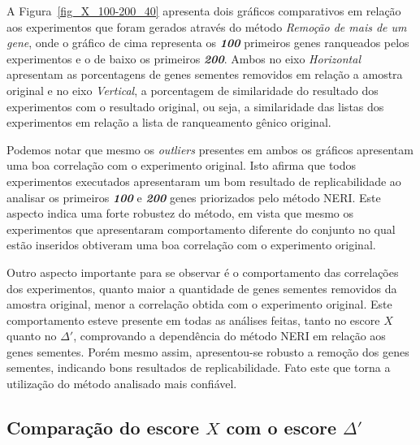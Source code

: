 %
A Figura~\ref{fig_X_100-200_40} apresenta dois gráficos comparativos em relação aos experimentos que foram gerados através do método \textsl{Remoção de mais de um gene}, onde o gráfico de cima representa os \textsl{\textbf{100}} primeiros genes ranqueados pelos experimentos e o de baixo os primeiros \textsl{\textbf{200}}. Ambos no eixo \textsl{Horizontal} apresentam as porcentagens de genes sementes removidos em relação a amostra original e no eixo \textsl{Vertical}, a porcentagem de similaridade do resultado dos experimentos com o resultado original, ou seja, a similaridade das listas dos experimentos em relação a lista de ranqueamento gênico original.
%

%
Podemos notar que mesmo os \textsl{outliers} presentes em ambos os gráficos apresentam uma boa correlação com o experimento original. Isto afirma que todos experimentos executados apresentaram um bom resultado de replicabilidade ao analisar os primeiros \textbf{\textsl{100}} e \textbf{\textsl{200}} genes priorizados pelo método NERI. Este aspecto indica uma forte robustez do método, em vista que mesmo os experimentos que apresentaram comportamento diferente do conjunto no qual estão inseridos obtiveram uma boa correlação com o experimento original.

%
Outro aspecto importante para se observar é o comportamento das correlações dos experimentos, quanto maior a quantidade de genes sementes removidos da amostra original, menor a correlação obtida com o experimento original. Este comportamento esteve presente em todas as análises feitas, tanto no escore $X$ quanto no $\Delta'$, comprovando a dependência do método NERI em relação aos genes sementes. Porém mesmo assim, apresentou-se robusto a remoção dos genes sementes, indicando bons resultados de replicabilidade. Fato este que torna a utilização do método analisado mais confiável. 
%

%
\subsection{
\label{sec:compXS}
Comparação do escore $X$ com o escore $\Delta'$}
%

